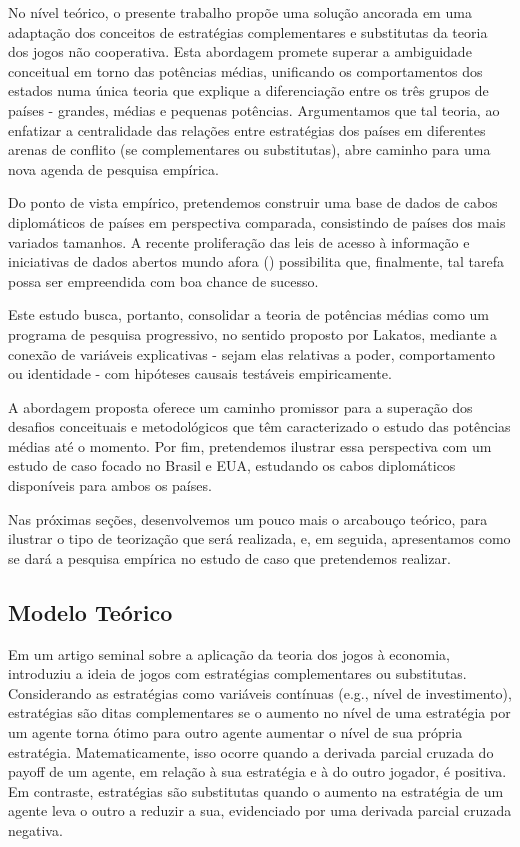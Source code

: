 \documentclass[]{interact}
\theoremstyle{plain}%
\theoremstyle{definition}
\theoremstyle{remark}
\begin{document}
No nível teórico, o presente trabalho propõe uma solução ancorada em uma
adaptação dos conceitos de estratégias complementares e substitutas da
teoria dos jogos não cooperativa. Esta abordagem promete superar a
ambiguidade conceitual em torno das potências médias, unificando os
comportamentos dos estados numa única teoria que explique a
diferenciação entre os três grupos de países - grandes, médias e
pequenas potências. Argumentamos que tal teoria, ao enfatizar a
centralidade das relações entre estratégias dos países em diferentes
arenas de conflito (se complementares ou substitutas), abre caminho para
uma nova agenda de pesquisa empírica.

Do ponto de vista empírico, pretendemos construir uma base de dados de
cabos diplomáticos de países em perspectiva comparada, consistindo de
países dos mais variados tamanhos. A recente proliferação das leis de
acesso à informação e iniciativas de dados abertos mundo afora
(\citet{zuffova_20}) possibilita que, finalmente, tal tarefa possa ser
empreendida com boa chance de sucesso.

Este estudo busca, portanto, consolidar a teoria de potências médias
como um programa de pesquisa progressivo, no sentido proposto por
Lakatos, mediante a conexão de variáveis explicativas - sejam elas
relativas a poder, comportamento ou identidade - com hipóteses causais
testáveis empiricamente.

A abordagem proposta oferece um caminho promissor para a superação dos
desafios conceituais e metodológicos que têm caracterizado o estudo das
potências médias até o momento. Por fim, pretendemos ilustrar essa
perspectiva com um estudo de caso focado no Brasil e EUA, estudando os
cabos diplomáticos disponíveis para ambos os países.

Nas próximas seções, desenvolvemos um pouco mais o arcabouço teórico,
para ilustrar o tipo de teorização que será realizada, e, em seguida,
apresentamos como se dará a pesquisa empírica no estudo de caso que
pretendemos realizar.

\hypertarget{modelo-teuxf3rico}{%
\subsection{Modelo Teórico}\label{modelo-teuxf3rico}}

Em um artigo seminal sobre a aplicação da teoria dos jogos à economia,
\citet{bulow_etal_85} introduziu a ideia de jogos com estratégias
complementares ou substitutas. Considerando as estratégias como
variáveis contínuas (e.g., nível de investimento), estratégias são ditas
complementares se o aumento no nível de uma estratégia por um agente
torna ótimo para outro agente aumentar o nível de sua própria
estratégia. Matematicamente, isso ocorre quando a derivada parcial
cruzada do payoff de um agente, em relação à sua estratégia e à do outro
jogador, é positiva. Em contraste, estratégias são substitutas quando o
aumento na estratégia de um agente leva o outro a reduzir a sua,
evidenciado por uma derivada parcial cruzada negativa.
\end{document}
